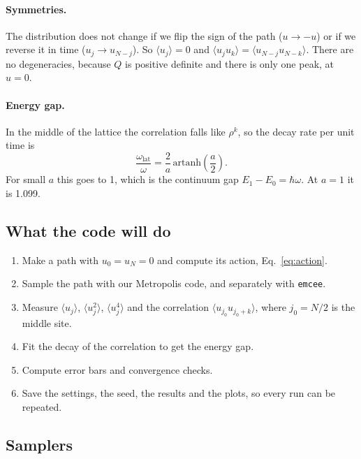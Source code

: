 \documentclass[11pt]{article}
\begin{document}
\paragraph{Symmetries.} The distribution does not change if we flip the sign of the path ($u \to -u$) or if we reverse it in time ($u_j \to u_{N-j}$). So $\langle u_j\rangle = 0$ and $\langle u_j u_k\rangle = \langle u_{N-j}u_{N-k}\rangle$. There are no degeneracies, because $Q$ is positive definite and there is only one peak, at $u = 0$.

\paragraph{Energy gap.} In the middle of the lattice the correlation falls like $\rho^k$, so the decay rate per unit time is
\begin{equation}
  \frac{\omega_{\text{lat}}}{\omega} = \frac{2}{a}\,\mathrm{artanh}\!\left(\frac a2\right).
  \label{eq:wlat}
\end{equation}
For small $a$ this goes to 1, which is the continuum gap $E_1 - E_0 = \hbar\omega$. At $a = 1$ it is 1.099.

\subsection{What the code will do}
\begin{enumerate}
  \item Make a path with $u_0 = u_N = 0$ and compute its action, Eq.~\eqref{eq:action}.
  \item Sample the path with our Metropolis code, and separately with \texttt{emcee}.
  \item Measure $\langle u_j\rangle$, $\langle u_j^2\rangle$, $\langle u_j^4\rangle$ and the correlation $\langle u_{j_0} u_{j_0+k}\rangle$, where $j_0 = N/2$ is the middle site.
  \item Fit the decay of the correlation to get the energy gap.
  \item Compute error bars and convergence checks.
  \item Save the settings, the seed, the results and the plots, so every run can be repeated.
\end{enumerate}

\subsection{Samplers}
\end{document}
